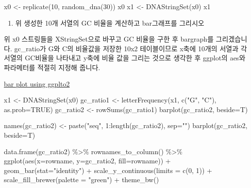 \documentclass[
]{book}
\newenvironment{Shaded}{\begin{snugshade}}{\end{snugshade}}
\newcommand{\AttributeTok}[1]{\textcolor[rgb]{0.77,0.63,0.00}{#1}}
\newcommand{\ConstantTok}[1]{\textcolor[rgb]{0.00,0.00,0.00}{#1}}
\newcommand{\DecValTok}[1]{\textcolor[rgb]{0.00,0.00,0.81}{#1}}
\newcommand{\FunctionTok}[1]{\textcolor[rgb]{0.00,0.00,0.00}{#1}}
\newcommand{\NormalTok}[1]{#1}
\newcommand{\OtherTok}[1]{\textcolor[rgb]{0.56,0.35,0.01}{#1}}
\newcommand{\SpecialCharTok}[1]{\textcolor[rgb]{0.00,0.00,0.00}{#1}}
\newcommand{\StringTok}[1]{\textcolor[rgb]{0.31,0.60,0.02}{#1}}
\providecommand{\tightlist}{%
  \setlength{\itemsep}{0pt}\setlength{\parskip}{0pt}}
\begin{document}
\begin{Shaded}
\begin{Highlighting}[]
\NormalTok{x0 }\OtherTok{\textless{}{-}} \FunctionTok{replicate}\NormalTok{(}\DecValTok{10}\NormalTok{, }\FunctionTok{random\_dna}\NormalTok{(}\DecValTok{30}\NormalTok{))}
\NormalTok{x0}
\NormalTok{x1 }\OtherTok{\textless{}{-}} \FunctionTok{DNAStringSet}\NormalTok{(x0)}
\NormalTok{x1}
\end{Highlighting}
\end{Shaded}

\begin{enumerate}
\def\labelenumi{\arabic{enumi}.}
\setcounter{enumi}{2}
\tightlist
\item
  위 생성한 10개 서열의 GC 비율을 계산하고 bar그래프를 그리시오
\end{enumerate}

위 x0 스트링들을 XStringSet으로 바꾸고 GC 비율을 구한 후 bargraph를 그리겠습니다. gc\_ratio가 G와 C의 비율값을 저장한 10x2 테이블이므로 x축에 10개의 서열과 각 서열의 GC비율을 나타내고 y축에 비율 값을 그리는 것으로 생각한 후 ggplot의 aes와 파라메터를 적절히 지정해 줍니다.

\href{https://greendaygh.github.io/kribbr2022/data-visualization.html\#bar-graph}{bar plot using ggplto2}

\begin{Shaded}
\begin{Highlighting}[]
\NormalTok{x1 }\OtherTok{\textless{}{-}} \FunctionTok{DNAStringSet}\NormalTok{(x0)}
\NormalTok{gc\_ratio1 }\OtherTok{\textless{}{-}} \FunctionTok{letterFrequency}\NormalTok{(x1, }\FunctionTok{c}\NormalTok{(}\StringTok{"G"}\NormalTok{, }\StringTok{"C"}\NormalTok{), }\AttributeTok{as.prob=}\ConstantTok{TRUE}\NormalTok{)}
\NormalTok{gc\_ratio2 }\OtherTok{\textless{}{-}} \FunctionTok{rowSums}\NormalTok{(gc\_ratio1)}
\FunctionTok{barplot}\NormalTok{(gc\_ratio2, }\AttributeTok{beside=}\NormalTok{T)}

\FunctionTok{names}\NormalTok{(gc\_ratio2) }\OtherTok{\textless{}{-}} \FunctionTok{paste}\NormalTok{(}\StringTok{"seq"}\NormalTok{, }\DecValTok{1}\SpecialCharTok{:}\FunctionTok{length}\NormalTok{(gc\_ratio2), }\AttributeTok{sep=}\StringTok{""}\NormalTok{)}
\FunctionTok{barplot}\NormalTok{(gc\_ratio2, }\AttributeTok{beside=}\NormalTok{T)}

\FunctionTok{data.frame}\NormalTok{(gc\_ratio2) }\SpecialCharTok{\%\textgreater{}\%} 
  \FunctionTok{rownames\_to\_column}\NormalTok{() }\SpecialCharTok{\%\textgreater{}\%} 
  \FunctionTok{ggplot}\NormalTok{(}\FunctionTok{aes}\NormalTok{(}\AttributeTok{x=}\NormalTok{rowname, }\AttributeTok{y=}\NormalTok{gc\_ratio2, }\AttributeTok{fill=}\NormalTok{rowname)) }\SpecialCharTok{+}
  \FunctionTok{geom\_bar}\NormalTok{(}\AttributeTok{stat=}\StringTok{"identity"}\NormalTok{) }\SpecialCharTok{+}
  \FunctionTok{scale\_y\_continuous}\NormalTok{(}\AttributeTok{limits =} \FunctionTok{c}\NormalTok{(}\DecValTok{0}\NormalTok{, }\DecValTok{1}\NormalTok{)) }\SpecialCharTok{+}
  \FunctionTok{scale\_fill\_brewer}\NormalTok{(}\AttributeTok{palette =} \StringTok{"green"}\NormalTok{) }\SpecialCharTok{+}
  \FunctionTok{theme\_bw}\NormalTok{()}
\end{Highlighting}
\end{Shaded}
\end{document}

